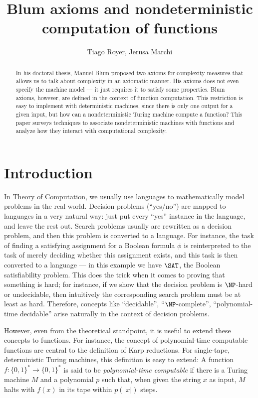 \documentclass[12pt]{article}
\title{Blum axioms and nondeterministic computation of functions}
\author{Tiago Royer\inst{1}, Jerusa Marchi\inst{2}}
\theoremstyle{definition}
\begin{document}
\maketitle

\begin{abstract}
    In his doctoral thesis,
    Manuel Blum proposed two axioms for complexity measures
    that allows us to talk about complexity in an axiomatic manner.
    His axioms does not even specify the machine model
    --- it just requires it to satisfy some properties.
    Blum axioms, however,
    are defined in the context of function computation.
    This restriction is easy to implement with deterministic machines,
    since there is only one output for a given input,
    but how can a nondeterministic Turing machine compute a function?
    This paper surveys techniques to associate
    nondeterministic machines with functions
    and analyze how they interact with computational complexity.
\end{abstract}

\section{Introduction}

In Theory of Computation,
we usually use languages
to mathematically model problems in the real world.
Decision problems (``yes/no'') are mapped to languages in a very natural way:
just put every ``yes'' instance in the language,
and leave the rest out.
Search problems usually are rewritten as a decision problem,
and then this problem is converted to a language.
For instance,
the task of finding a satisfying assignment for a Boolean formula $\phi$
is reinterpreted to the task of merely deciding whether this assignment exists,
and this task is then converted to a language
--- in this example we have $\SAT$, the Boolean satisfiability problem.
This does the trick when it comes to proving that something is hard;
for instance, if we show that the decision problem is $\NP$-hard or undecidable,
then intuitively the corresponding search problem must be at least as hard.
Therefore,
concepts like ``decidable'', ``$\NP$-complete'', ``polynomial-time decidable''
arise naturally in the context of decision problems.

However, even from the theoretical standpoint,
it is useful to extend these concepts to functions.
For instance,
the concept of polynomial-time computable functions
are central to the definition of Karp reductions.
For single-tape, deterministic Turing machines,
this definition is easy to extend:
A function $f : \{0, 1\}^* \to \{0, 1\}^*$
is said to be \emph{polynomial-time computable}
if there is a Turing machine $M$ and a polynomial $p$ such that,
when given the string $x$ as input,
$M$ halts with $f(x)$ in its tape within $p(|x|)$ steps.
\end{document}
